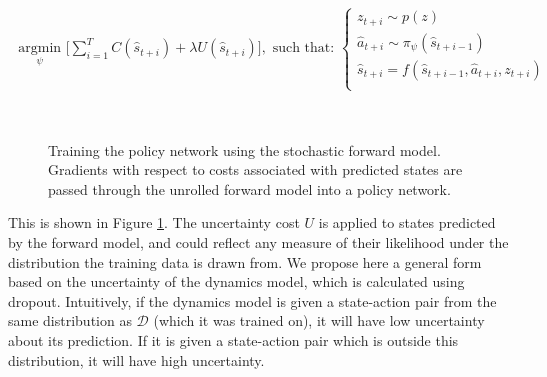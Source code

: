 \documentclass{article} %
\begin{document}
        \begin{align*}
    \underset{\psi}{\mbox{ argmin }} \Big[ \sum_{i=1}^{T} C(\hat{s}_{t+i}) + \lambda U(\hat{s}_{t+i}) \Big],  \mbox{ such that: }
    \begin{cases}
      z_{t+i} \sim p(z) \\
      \hat{a}_{t+i} \sim \pi_\psi(\hat{s}_{t+i-1}) \\
      \hat{s}_{t+i} = f(\hat{s}_{t+i-1}, \hat{a}_{t+i}, z_{t+i}) \\
      \end{cases}
        \end{align*}

\begin{figure}[t!]
    \centering
     \\
    \caption{Training the policy network using the stochastic forward model. Gradients with respect to costs associated with predicted states are passed through the unrolled forward model into a policy network.}
    \label{svg}
\end{figure}
        

        This is shown in Figure \ref{svg}. The uncertainty cost $U$ is applied to states predicted by the forward model, and could reflect any measure of their likelihood under the distribution the training data is drawn from.
        We propose here a general form based on the uncertainty of the dynamics model, which is calculated using dropout.
        Intuitively, if the dynamics model is given a state-action pair from the same distribution as $\mathcal{D}$ (which it was trained on), it will have low uncertainty about its prediction.
        If it is given a state-action pair which is outside this distribution, it will have high uncertainty.
\end{document}
